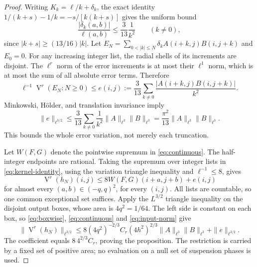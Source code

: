 \documentclass[11pt]{article}
\DeclareMathOperator{\Var}{V}
\begin{document}
\begin{proof}
Writing $K_k=\ell/k+\delta_k$, the exact identity
$1/(k+s)-1/k=-s/[k(k+s)]$ gives the uniform bound
\begin{equation}\label{eq:error}
 \frac{|\delta_k(a,b)|}{\ell(a,b)}
 \le\frac{3}{13}\frac1{k^2}\qquad(k\ne0),
\end{equation}
since $|k+s|\ge(13/16)|k|$.
Let $E_N=\sum_{0<|k|\le N}\delta_k A(i+k,j)B(i,j+k)$ and $E_0=0$.
For any increasing integer list, the radial shells of its increments
are disjoint. The $\ell^r$ norm of the error increments is at most their
$\ell^1$ norm, which is at most the sum of all absolute error terms.
Therefore
\[
 \ell^{-1}\Var^r(E_N:N\ge0)
 \le e(i,j):=\frac3{13}\sum_{k\ne0}
                  \frac{|A(i+k,j)B(i,j+k)|}{k^2}.
\]
Minkowski, H\"older, and translation invariance imply
\begin{equation}\label{eq:error-norm}
 \|e\|_{\ell^{3/2}}
 \le\frac3{13}\sum_{k\ne0}\frac1{k^2}
                      \|A\|_{\ell^3}\|B\|_{\ell^3}
 =\frac{\pi^2}{13}\|A\|_{\ell^3}\|B\|_{\ell^3}.
\end{equation}
This bounds the whole error variation, not merely each truncation.

Let $W(F,G)$ denote the pointwise supremum in
\eqref{eq:continuous}. The half-integer endpoints are rational.
Taking the supremum over integer lists in \eqref{eq:kernel-identity},
using the variation triangle inequality and $\ell^{-1}\le8$, gives
\begin{equation}\label{eq:boxwise}
 \Var^r(h_N)(i,j)\le8W(F,G)(i+a,j+b)+e(i,j)
\end{equation}
for almost every $(a,b)\in(-q,q)^2$, for every $(i,j)$.
All lists are countable, so one common exceptional set suffices.
Apply the $L^{3/2}$ triangle inequality on the disjoint output boxes,
whose area is $4q^2=1/64$. The left side is constant on each box,
so \eqref{eq:boxwise}, \eqref{eq:continuous} and
\eqref{eq:input-norm} give
\[
 \|\Var^r(h_N)\|_{\ell^{3/2}}
 \le8(4q^2)^{-2/3}C_r(4h^2)^{2/3}
                        \|A\|_{\ell^3}\|B\|_{\ell^3}
      +\|e\|_{\ell^{3/2}}.
\]
The coefficient equals $8\,4^{2/3}C_r$, proving the proposition.
The restriction is carried by a fixed set of positive area;
no evaluation on a null set of suspension phases is used.
\end{proof}
\end{document}
